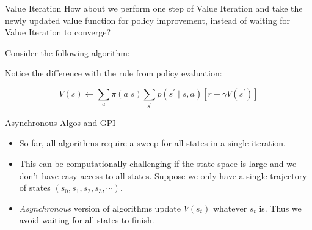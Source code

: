 \documentclass[handout]{beamer}
\begin{document}
\begin{frame}{Value Iteration}
\small
    How about we perform one step of Value Iteration and take the newly updated value function for policy improvement, instead of waiting for Value Iteration to converge?

    Consider the following algorithm:
\begin{algorithm}[H]
\caption{Value Iteration}
\end{algorithm}
Notice the difference with the rule from policy evaluation:

\color{red}
$$
V(s) \leftarrow \sum_a \pi(a|s) \sum_{s^{\prime}} p\left(s^{\prime} \mid s, a\right)\left[r+\gamma V\left(s^{\prime}\right)\right]
$$
\end{frame}

\begin{frame}{Asynchronous Algos and GPI}
\small
\begin{itemize}[<+(1)->]
	\item So far, all algorithms require a sweep for all states in a single iteration. 
	\item This can be computationally challenging if the state space is large and we don't have easy access to all states. Suppose we only have a single trajectory of states $(s_0, s_1, s_2, s_3, \cdots)$. 
	\item \textit{Asynchronous} version of algorithms update $V(s_t)$ whatever $s_t$ is. Thus we avoid waiting for all states to finish.
\end{itemize}
\end{frame}
\end{document}
